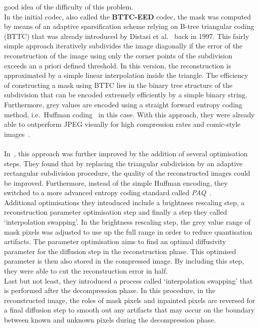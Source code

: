 good idea of the difficulty of this problem.\\
In the initial codec, also called the \textbf{BTTC-EED} codec, the mask was
computed by means of an adaptive sparsification scheme relying on B-tree triangular coding (BTTC)
that was already introduced by Distasi et al.~\cite{distasi97} back in 1997. This fairly simple
approach iteratively subdivides the image diagonally if the error of the reconstruction of the image using only
the corner points of the subdivision exceeds an a priori defined threshold. In this version, the
reconstruction is approximated by a simple linear interpolation inside the triangle. The efficiency
of constructing a mask using BTTC lies in the binary tree structure of the subdivision that can be encoded extremely
efficiently by a simple binary string. Furthermore, grey values are encoded using a straight
forward entropy coding method, i.e.\ Huffman coding~\cite{huffman} in this case.
With this approach, they were already able to outperform JPEG visually for high
compression rates and comic-style images~\cite{galic05}.\\
\\
In~\cite{schmaltz09}, this approach was further improved by the addition of several optimisation
steps. They found that by replacing the triangular subdivision by an adaptive rectangular
subdivision procedure, the quality of the reconstructed images could be improved. Furthermore,
instead of the simple Huffman encoding, they switched to a more advanced entropy coding standard
called \textit{PAQ}~\cite{paq}. \\
Additional optimisations they introduced include a brightness rescaling
step, a reconstruction parameter optimisation step and finally a step they called `interpolation
swapping'.
In the brightness rescaling step, the grey value range of mask pixels was adjusted to use up the 
full range in order to reduce quantisation artifacts.
The parameter optimisation aims to find an optimal diffusivity parameter for the diffusion step in
the reconstruction phase. This optimised parameter is then also stored in the compressed image.
By including this step, they were able to cut the reconstruction error in half.\\
Last but not least, they introduced a process called `interpolation swapping' that is performed
after the decompression phase. In this procedure, in the reconstructed image, the roles of mask
pixels and inpainted pixels are reversed for a final diffusion step to smooth out any artifacts
that may occur on the boundary between known and unknown pixels during the decompression phase.\\
